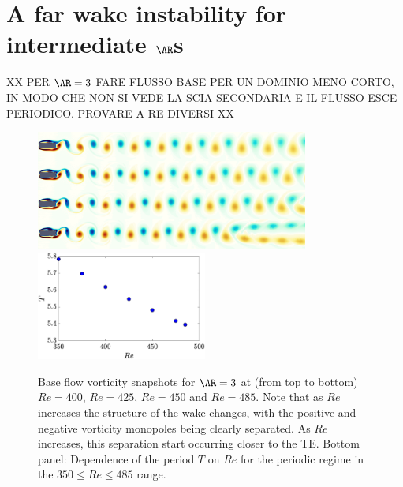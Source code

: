 \section{A far wake instability for intermediate $\AR$s}

XX PER $\AR=3$ FARE FLUSSO BASE PER UN DOMINIO MENO CORTO, IN MODO CHE NON SI VEDE LA SCIA SECONDARIA E IL FLUSSO ESCE PERIODICO. PROVARE A RE DIVERSI XX


\begin{figure}
  \centering
  \includegraphics[width=0.8\textwidth]{./fig/AR3/BF_vort_Re400_475.png}
  \includegraphics[width=0.5\textwidth]{./fig/AR3/T_Re.eps}
  \caption{Base flow vorticity snapshots for $\AR=3$ at (from top to bottom) $Re=400$, $Re=425$, $Re=450$ and $Re=485$. Note that as $Re$ increases the structure of the wake changes, with the positive and negative vorticity monopoles being clearly separated. As $Re$ increases, this separation start occurring closer to the TE. Bottom panel: Dependence of the period $T$ on $Re$ for the periodic regime in the $350 \le Re \le 485$ range.}
  \label{fig:BF_AR3}
\end{figure}

